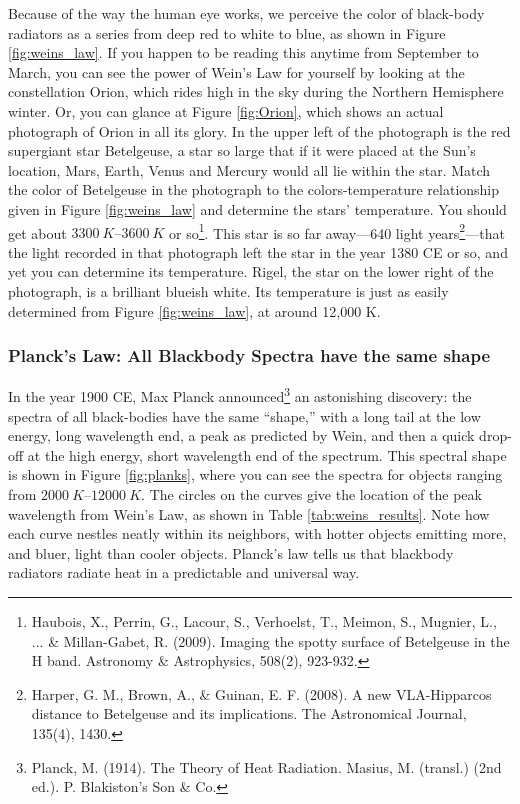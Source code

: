 \documentclass[amstex,12pt]{book}
\begin{document}
Because of the way the human eye works, we perceive the color of black-body radiators as a series from deep red to white to blue, as shown in Figure \ref{fig:weins_law}. If you happen to be reading this anytime from September to March, you can see the power of Wein’s Law for yourself by looking at the constellation Orion, which rides high in the sky during the Northern Hemisphere winter. Or, you can glance at Figure \ref{fig:Orion}, which shows an actual photograph of Orion in all its glory. In the upper left of the photograph is the red supergiant star Betelgeuse, a star so large that if it were placed at the Sun’s location, Mars, Earth, Venus and Mercury would all lie within the star. Match the color of Betelgeuse in the photograph to the colors-temperature relationship given in Figure \ref{fig:weins_law} and determine the stars’ temperature. You should get about $\SIrange{3300}{3600}{K}$ or so\footnote{Haubois, X., Perrin, G., Lacour, S., Verhoelst, T., Meimon, S., Mugnier, L., ... \& Millan-Gabet, R. (2009). Imaging the spotty surface of Betelgeuse in the H band. Astronomy \& Astrophysics, 508(2), 923-932.}. This star is so far away---640 light years\footnote{Harper, G. M., Brown, A., \& Guinan, E. F. (2008). A new VLA-Hipparcos distance to Betelgeuse and its implications. The Astronomical Journal, 135(4), 1430. }---that the light recorded in that photograph left the star in the year 1380 CE or so, and yet you can determine its temperature. Rigel, the star on the lower right of the photograph, is a brilliant blueish white. Its temperature is just as easily determined from Figure \ref{fig:weins_law}, at around 12,000 K. 

\subsubsection{Planck’s Law: All Blackbody Spectra have the same shape}
In the year 1900 CE, Max Planck announced\footnote{Planck, M. (1914). The Theory of Heat Radiation. Masius, M. (transl.) (2nd ed.). P. Blakiston's Son \& Co.} an astonishing discovery: the spectra of all black-bodies have the same ``shape,'' with a long tail at the low energy, long wavelength end, a peak as predicted by Wein, and then a quick drop-off at the high energy, short wavelength end of the spectrum. This spectral shape is shown in Figure \ref{fig:planks}, where you can see the spectra for objects ranging from $\SIrange{2000}{12000}{K}$. The circles on the curves give the location of the peak wavelength from Wein’s Law, as shown in Table \ref{tab:weins_results}. Note how each curve nestles neatly within its neighbors, with hotter objects emitting more, and bluer, light than cooler objects. Planck's law tells us that blackbody radiators radiate heat in a predictable and universal way. 
\end{document}
